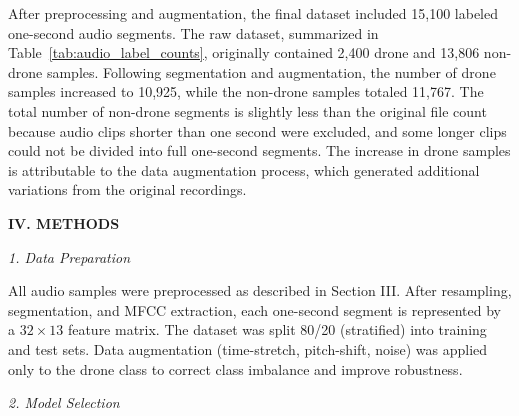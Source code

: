 \documentclass[12pt]{article}
\begin{document}
{After preprocessing and augmentation, the final dataset included 15,100 labeled one-second audio segments. The raw dataset, summarized in Table~\ref{tab:audio_label_counts}, originally contained 2,400 drone and 13,806 non-drone samples. Following segmentation and augmentation, the number of drone samples increased to 10,925, while the non-drone samples totaled 11,767. The total number of non-drone segments is slightly less than the original file count because audio clips shorter than one second were excluded, and some longer clips could not be divided into full one-second segments. The increase in drone samples is attributable to the data augmentation process, which generated additional variations from the original recordings.

}

\begin{center}
{\fontsize{9}{11}\selectfont\bfseries IV. METHODS}
\end{center}

\begin{center}
{\fontsize{9}{11}\selectfont\textit{1. Data Preparation}}
\end{center}

\vspace{0.2em}

{\fontsize{9}{11}\selectfont
All audio samples were preprocessed as described in Section III. After resampling, segmentation, and MFCC extraction, each one-second segment is represented by a \(32\times13\) feature matrix. The dataset was split 80/20 (stratified) into training and test sets. Data augmentation (time-stretch, pitch-shift, noise) was applied only to the drone class to correct class imbalance and improve robustness.

}

\begin{center}
{\fontsize{9}{11}\selectfont\textit{2. Model Selection}} 
\end{center}

\vspace{0.2em}
\end{document}
